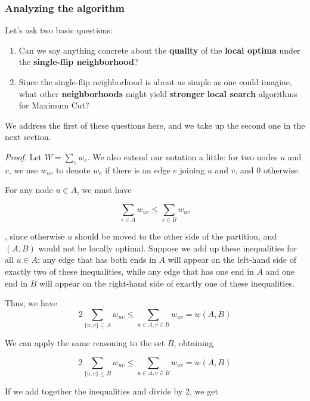 
\subsubsection{Analyzing the algorithm}

Let’s ask two basic questions:
\begin{enumerate}
    \item Can we say anything concrete about the \textbf{quality} of the \textbf{local optima} under the \textbf{single-flip neighborhood}?
    \item Since the single-flip neighborhood is about as simple as one could imagine, what other \textbf{neighborhoods} might yield \textbf{stronger} \textbf{local search} algorithms for Maximum Cut?
\end{enumerate}

We address the first of these questions here, and we take up the second one in the next section.


\textit{Proof.} Let $W = \sum_e w_e$. We also extend our notation a little: for two nodes $u$ and $v$, we use $w_{uv}$ to denote $w_e$ if there is an edge $e$ joining $u$ and $v$, and 0 otherwise. 

For any node $u \in A$, we must have

$$
\sum_{v \in A} w_{uv} \leq \sum_{v \in B} w_{uv}
$$

, since otherwise $u$ should be moved to the other side of the partition, and $(A, B)$ would not be locally optimal. Suppose we add up these inequalities for all $u \in A$; any edge that has both ends in $A$ will appear on the left-hand side of exactly two of these inequalities, while any edge that has one end in $A$ and one end in $B$ will appear on the right-hand side of exactly one of these inequalities. 

Thus, we have
$$2 \sum_{\{u,v\} \subseteq A} w_{uv} \leq \sum_{u \in A,v \in B} w_{uv} = w(A, B)$$

We can apply the same reasoning to the set $B$, obtaining

$$2 \sum_{\{u,v\} \subseteq B} w_{uv} \leq \sum_{u \in A,v \in B} w_{uv} = w(A, B)$$

If we add together the inequalities  and divide by 2, we get

